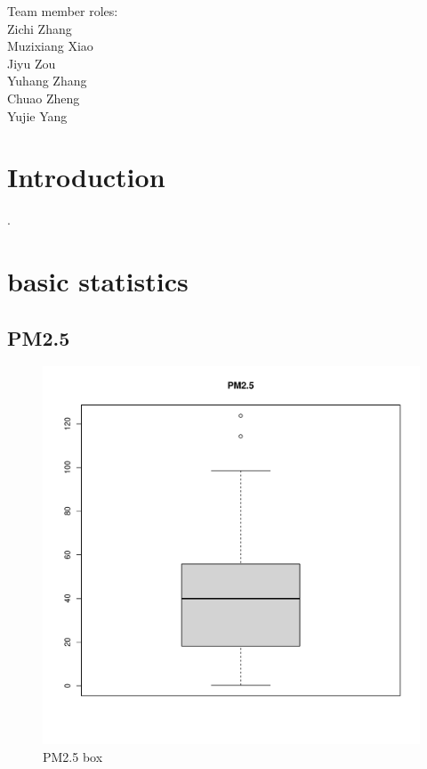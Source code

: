 \documentclass[a4paper,12pt,reqno]{report}
\begin{document}


\vspace*{\fill}
\begin{flushleft}
    Team member roles:\\
    Zichi Zhang\\
    Muzixiang Xiao\\
    Jiyu Zou\\
    Yuhang Zhang\\
    Chuao Zheng\\
    Yujie Yang
\end{flushleft}
\vspace*{\fill}
\thispagestyle{empty}

\begin{abstract}

\end{abstract}

\section{Introduction}
\label{sec:Introduction}
\cite{Basic_Information_about_NO2}. 
\newpage

\section{basic statistics}
\label{sec:basic statistics}
\subsection{PM2.5}
\begin{figure}[H]
    \centering
    \vspace{-0.35cm}
    \includegraphics[width=0.7\linewidth]{figures/PM25_box.pdf}
    \caption{PM2.5 box}
\end{figure}
\end{document}

